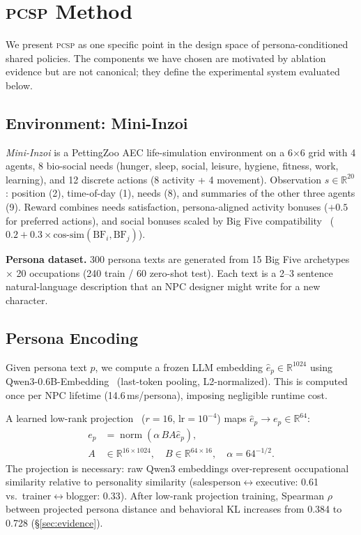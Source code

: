 \documentclass[conference]{IEEEtran}
\newcommand{\PCSP}{\textsc{pcsp}\xspace}
\begin{document}
\section{\PCSP Method}
\label{sec:method}

We present \PCSP as one specific point in the design space of persona-conditioned
shared policies. The components we have chosen are motivated by ablation evidence
but are not canonical; they define the experimental system evaluated below.

\subsection{Environment: Mini-Inzoi}

\textit{Mini-Inzoi} is a PettingZoo AEC life-simulation environment on a
6$\times$6 grid with 4 agents, 8 bio-social needs (hunger, sleep, social,
leisure, hygiene, fitness, work, learning), and 12 discrete actions
(8 activity + 4 movement).
Observation $s\!\in\!\mathbb{R}^{20}$: position (2), time-of-day (1), needs (8),
and summaries of the other three agents (9).
Reward combines needs satisfaction, persona-aligned activity bonuses ($+0.5$ for
preferred actions), and social bonuses scaled by Big Five
compatibility~\cite{mccrae1992introduction}
($0.2 + 0.3 \times \text{cos-sim}(\text{BF}_i, \text{BF}_j)$).

\textbf{Persona dataset.}
300 persona texts are generated from 15 Big Five archetypes $\times$ 20
occupations (240 train / 60 zero-shot test).
Each text is a 2--3 sentence natural-language description that an NPC designer
might write for a new character.

\subsection{Persona Encoding}

Given persona text $p$, we compute a frozen LLM embedding
$\hat{e}_p \in \mathbb{R}^{1024}$ using Qwen3-0.6B-Embedding~\cite{qwen3embed}
(last-token pooling, L2-normalized).
This is computed once per NPC lifetime (14.6\,ms/persona), imposing negligible
runtime cost.

A learned low-rank projection~\cite{hu2022lora} ($r\!=\!16$,
$\text{lr}\!=\!10^{-4}$) maps $\hat{e}_p \to e_p \in \mathbb{R}^{64}$:
\[
\begin{aligned}
  e_p &= \operatorname{norm}\!\left(\alpha\, B A \hat{e}_p\right), \\
  A &\in \mathbb{R}^{16\times1024},\quad
  B \in \mathbb{R}^{64\times16},\quad
  \alpha = 64^{-1/2}.
\end{aligned}
\]
The projection is necessary: raw Qwen3 embeddings over-represent occupational
similarity relative to personality similarity (salesperson$\leftrightarrow$executive:
0.61 vs.\ trainer$\leftrightarrow$blogger: 0.33).
After low-rank projection training, Spearman $\rho$ between projected persona
distance and behavioral KL increases from 0.384 to 0.728
(\S\ref{sec:evidence}).
\end{document}
